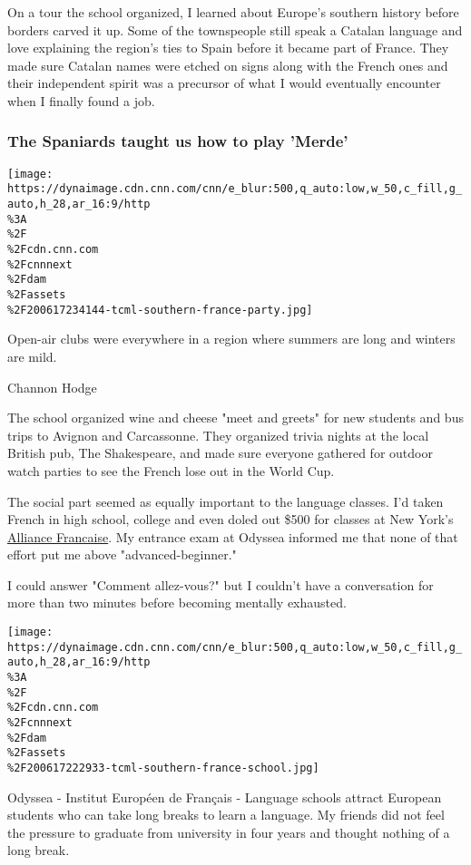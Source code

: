 On a tour the school organized, I learned about Europe's southern
history before borders carved it up. Some of the townspeople still speak
a Catalan language and love explaining the region's ties to Spain before
it became part of France. They made sure Catalan names were etched on
signs along with the French ones and their independent spirit was a
precursor of what I would eventually encounter when I finally found a
job.

\hypertarget{the-spaniards-taught-us-how-to-play-merde}{%
\subsubsection{The Spaniards taught us how to play
'Merde'}\label{the-spaniards-taught-us-how-to-play-merde}}

\texttt{[image: https://dynaimage.cdn.cnn.com/cnn/e\_blur:500,q\_auto:low,w\_50,c\_fill,g\_auto,h\_28,ar\_16:9/http\\\%3A\\\%2F\\\%2Fcdn.cnn.com\\\%2Fcnnnext\\\%2Fdam\\\%2Fassets\\\%2F200617234144-tcml-southern-france-party.jpg]}

Open-air clubs were everywhere in a region where summers are long and
winters are mild.

Channon Hodge

The school organized wine and cheese "meet and greets" for new students
and bus trips to Avignon and Carcassonne. They organized trivia nights
at the local British pub, The Shakespeare, and made sure everyone
gathered for outdoor watch parties to see the French lose out in the
World Cup.

The social part seemed as equally important to the language classes. I'd
taken French in high school, college and even doled out \$500 for
classes at New York's \href{https://fiaf.org/}{Alliance Francaise}. My
entrance exam at Odyssea informed me that none of that effort put me
above "advanced-beginner."

I could answer "Comment allez-vous?" but I couldn't have a conversation
for more than two minutes before becoming mentally exhausted.

\texttt{[image: https://dynaimage.cdn.cnn.com/cnn/e\_blur:500,q\_auto:low,w\_50,c\_fill,g\_auto,h\_28,ar\_16:9/http\\\%3A\\\%2F\\\%2Fcdn.cnn.com\\\%2Fcnnnext\\\%2Fdam\\\%2Fassets\\\%2F200617222933-tcml-southern-france-school.jpg]}

Odyssea - Institut Européen de Français - Language schools attract
European students who can take long breaks to learn a language. My
friends did not feel the pressure to graduate from university in four
years and thought nothing of a long break.

